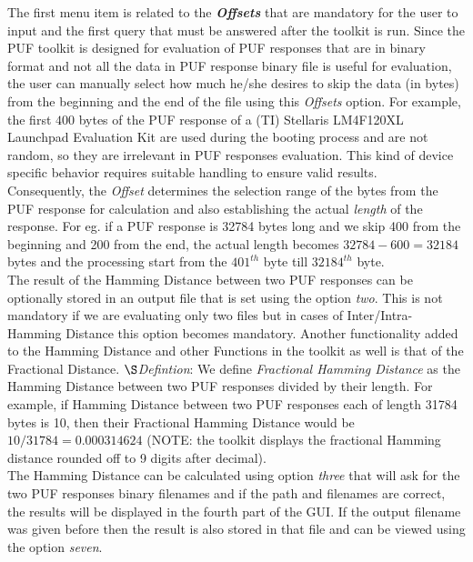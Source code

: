 The first menu item is related to the \emph{\textbf{Offsets}} that are mandatory for the user to input and the first query that must be answered after the toolkit is run. Since the PUF toolkit is designed for evaluation of PUF responses that are in binary format and not all the data in PUF response binary file is useful for evaluation, the user can manually select how much he/she desires to skip the data (in bytes) from the beginning and the end of the file using this \emph{Offsets} option.
For example, the first $400$ bytes of the PUF response of a (TI) Stellaris LM4F120XL Launchpad Evaluation Kit are used during the booting process and are not random, so they are irrelevant in PUF responses evaluation. This kind of device specific behavior requires suitable handling to ensure valid results.\\

Consequently, the \emph{Offset} determines the selection range of the bytes from the PUF response for calculation and also establishing the actual \emph{length} of the response. For eg. if a PUF response is 32784 bytes long and we skip 400 from the beginning and 200 from the end, the actual length becomes $32784-600 = 32184$ bytes and the processing start from the $401^{th}$ byte till $32184^{th}$ byte.\\

The result of the Hamming Distance between two PUF responses can be optionally stored in an output file that is set using the option \emph{two}. This is not mandatory if we are evaluating only two files but in cases of Inter/Intra-Hamming Distance this option becomes mandatory. Another functionality added to the Hamming Distance and other Functions in the toolkit as well is that of the Fractional Distance. \newline
$\S$\emph{Defintion}: We define \emph{Fractional Hamming Distance} as the Hamming Distance between two PUF
responses divided by their length. For example, if Hamming Distance between two PUF responses each of length 31784 bytes is 10, then their Fractional Hamming Distance would be $ 10 / 31784 = 0.000314624$ (NOTE: the toolkit displays the fractional Hamming distance rounded off to 9 digits after decimal).\\

The Hamming Distance can be calculated using option \emph{three} that will ask for the two PUF responses binary filenames and if the path and filenames are correct, the results will be displayed in the fourth part of the GUI. If the output filename was given before then the result is also stored in that file and can be viewed using the option \emph{seven}.\\

